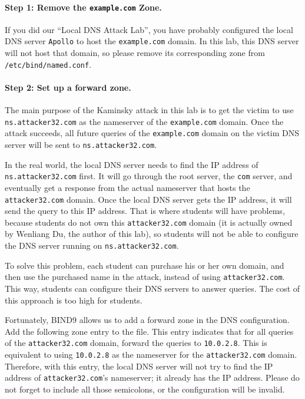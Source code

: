 \paragraph{Step 1: Remove the {\tt example.com} Zone.}
If you did our ``Local DNS Attack Lab'', you have probably configured the
local DNS server {\tt Apollo} to host the {\tt example.com} domain. In this lab,
this DNS server will not host that domain, so please remove its
corresponding zone from {\tt /etc/bind/named.conf}.



\paragraph{Step 2: Set up a forward zone.}
The main purpose of the Kaminsky attack in this lab is to
get the victim to use \texttt{ns.attacker32.com} as
the nameserver of the \texttt{example.com} domain. Once the attack
succeeds, all future queries of the \texttt{example.com} domain on the victim
DNS server will be sent to \texttt{ns.attacker32.com}. 



In the real world, the local DNS server needs to 
find the IP address of \texttt{ns.attacker32.com} first. 
It will go through the root server, the \texttt{com} server,
and eventually get a response from the actual 
nameserver that hosts the \texttt{attacker32.com} domain.  
Once the local DNS server gets the IP address, it will send
the query to this IP address. That is where students will have problems,
because students do not own this \texttt{attacker32.com} domain (it is
actually owned by Wenliang Du, the author of this lab), so students will not 
be able to configure the DNS server running on \texttt{ns.attacker32.com}.


To solve this problem, each student can purchase his or her own domain, and then
use the purchased name in the attack, instead of using \texttt{attacker32.com}.
This way, students can configure their DNS
servers to answer queries. The cost of this approach is too high for students. 


Fortunately, BIND9 allows us to add a forward zone in the DNS configuration. 
Add the following zone entry to the  file. 
This entry indicates that for all queries of the \texttt{attacker32.com}
domain, forward the queries to \texttt{10.0.2.8}. 
This is equivalent to using \texttt{10.0.2.8} as the nameserver 
for the \texttt{attacker32.com} domain. Therefore, with this entry,
the local DNS server will not try to find the IP address of 
\texttt{attacker32.com}'s nameserver; it already has the IP address. 
Please do not forget to include all those semicolons, or the 
configuration will be invalid.


